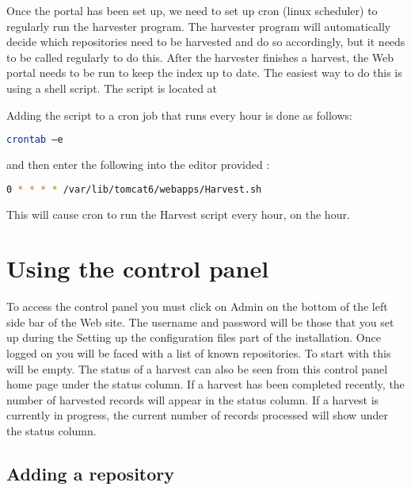 \documentclass[a4paper,11pt]{article}
\begin{document}
Once the portal has been set up, we need to set up cron (linux scheduler) to regularly run the harvester program. The harvester program will automatically decide which repositories need to be harvested and do so accordingly, but it needs to be called regularly to do this. After the harvester finishes a harvest, the Web portal needs to be run to keep the index up to date. The easiest way to do this is using a shell script. The script is located at 

Adding the script to a cron job that runs every hour is done as follows: 

\begin{lstlisting}[language=bash]
 crontab –e
\end{lstlisting}

and then enter the following into the editor provided : 

\begin{lstlisting}[language=bash]
 0 * * * * /var/lib/tomcat6/webapps/Harvest.sh
\end{lstlisting}

This will cause cron to run the Harvest script every hour, on the hour.

\section{Using the control panel}

To access the control panel you must click on Admin on the bottom of the left side bar of the Web site. The username and password will be those that you set up during the Setting up the configuration files part of the installation. Once logged on you will be faced with a list of known repositories. To start with this will be empty. The status of a harvest can also be seen from this control panel home page under the status column. If a harvest has been completed recently, the number of harvested records will appear in the status column. If a harvest is currently in progress, the current number of records processed will show under the status column.

\subsection{Adding a repository}
\end{document}
